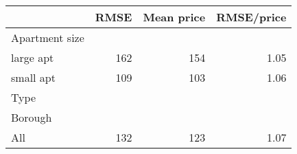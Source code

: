 
\begin{tabular}{lrrr}
\toprule
 & RMSE & Mean price & RMSE/price\\
\midrule
Apartment size &  &  & \\
large apt & 162 & 154 & 1.05\\
small apt & 109 & 103 & 1.06\\
Type &  &  & \\
Borough &  &  & \\
All & 132 & 123 & 1.07\\
\bottomrule
\end{tabular}